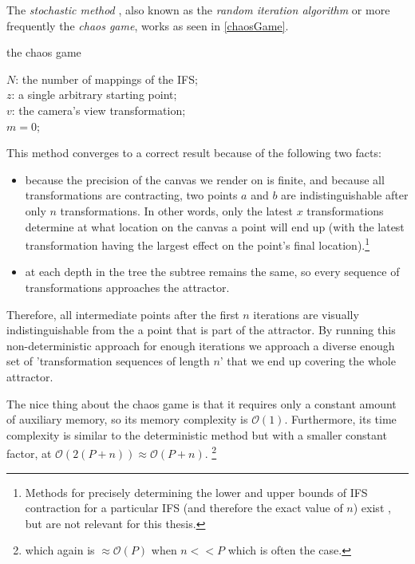 \documentclass[11pt]{article}
\begin{document}
The \emph{stochastic method} \cite{hepting1991rendering}, also known as the \emph{random iteration algorithm} \cite{barnsley1988fractals} or more frequently the \emph{chaos game}, works as seen in \autoref{chaosGame}.

\begin{algorithm}
\caption{the chaos game}
\label{chaosGame}
  $N$: the number of mappings of the IFS; \\
  $z$: a single arbitrary starting point; \\
  $v$: the camera's view transformation; \\
  $m = 0$; \\
  \For{$m \in [0..n + P)$}{ 
    $i$: a random integer between $0$ and $N$;  \\
    \If{$m \geq n$}{
      render($v(z)$) cumulatively; \\
    }
    $z = f_i(z)$; \\
  }

\end{algorithm}

This method converges to a correct result because of the following two facts:

\begin{itemize}
\item because the precision of the canvas we render on is finite, and because all transformations are contracting,
two points \(a\) and \(b\) are indistinguishable after only \(n\) transformations.
 In other words, only the latest \(x\) transformations determine at what location on the canvas a point will end up (with the latest transformation having the largest effect on the point's final location).\footnote{Methods for precisely determining the lower and upper bounds of IFS contraction for a particular IFS (and therefore the exact value of \(n\)) exist \cite{hepting1991rendering}, 
but are not relevant for this thesis.}
\item at each depth in the tree the subtree remains the same, so every sequence of transformations approaches the attractor.
\end{itemize}

Therefore, all intermediate points after the first \(n\) iterations are visually indistinguishable from the a point that is part of the attractor.
By running this non-deterministic approach for enough iterations we approach a diverse enough set of 'transformation sequences of length \(n\)' that we end up covering the whole attractor.

The nice thing about the chaos game is that it requires only a constant amount of auxiliary memory, so its memory complexity is \(\mathcal{O}(1)\).
Furthermore, its time complexity is similar to the deterministic method but with a smaller constant factor, at \(\mathcal{O}(2(P + n)) \approx \mathcal{O}(P + n)\). \footnote{which again is \(\approx \mathcal{O}(P)\) when \(n << P\) which is often the case.}
\end{document}
